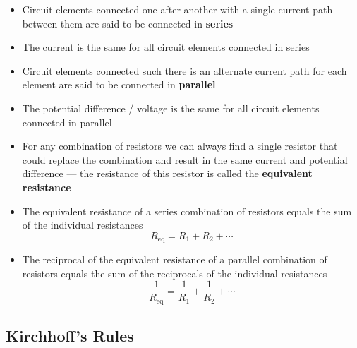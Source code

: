\documentclass{article}
\begin{document}
\begin{itemize}
  \item Circuit elements connected one after another with a single current path between them are said to be connected in \textbf{series}

  \item The current is the same for all circuit elements connected in series

  \item Circuit elements connected such there is an alternate current path for each element are said to be connected in \textbf{parallel}

  \item The potential difference / voltage is the same for all circuit elements connected in parallel

  \item For any combination of resistors we can always find a single resistor that could replace the combination and result in the same current and potential difference — the resistance of this resistor is called the \textbf{equivalent resistance}

  \item The equivalent resistance of a series combination of resistors equals the sum of the individual resistances \[R_\textrm{eq} = R_1 + R_2 + \cdots\]

  \item The reciprocal of the equivalent resistance of a parallel combination of resistors equals the sum of the reciprocals of the individual resistances \[\frac{1}{R_\textrm{eq}} = \frac{1}{R_1} + \frac{1}{R_2} + \cdots\]
\end{itemize}

\subsection{Kirchhoff's Rules}
\end{document}
